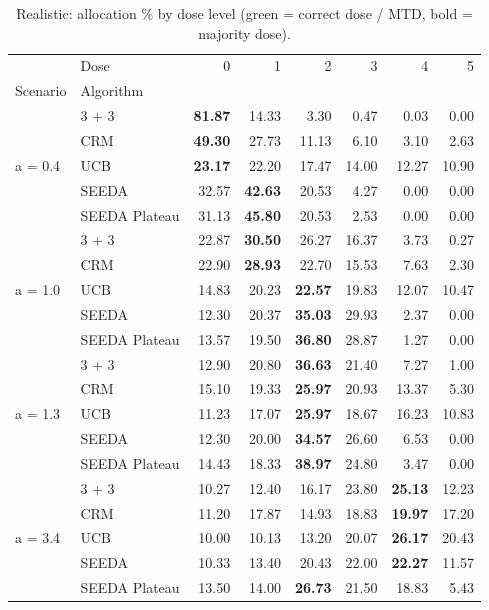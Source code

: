 \begin{table}
\centering
\caption{Realistic: allocation \% by dose level (green = correct dose / MTD, bold = majority dose).}
\label{tab:real_alloc_by_dose}
\begin{tabular}{llrrrrrr}
\toprule
 & Dose & 0 & 1 & 2 & 3 & 4 & 5 \\
Scenario & Algorithm &  &  &  &  &  &  \\
\midrule
\multirow[c]{5}{*}{a = 0.4} & 3 + 3 & {\cellcolor[HTML]{C8E6C9}} \bfseries 81.87 & 14.33 & 3.30 & 0.47 & 0.03 & 0.00 \\
 & CRM & {\cellcolor[HTML]{C8E6C9}} \bfseries 49.30 & 27.73 & 11.13 & 6.10 & 3.10 & 2.63 \\
 & UCB & {\cellcolor[HTML]{C8E6C9}} \bfseries 23.17 & 22.20 & 17.47 & 14.00 & 12.27 & 10.90 \\
 & SEEDA & {\cellcolor[HTML]{C8E6C9}} 32.57 & \bfseries 42.63 & 20.53 & 4.27 & 0.00 & 0.00 \\
 & SEEDA Plateau & {\cellcolor[HTML]{C8E6C9}} 31.13 & \bfseries 45.80 & 20.53 & 2.53 & 0.00 & 0.00 \\
\multirow[c]{5}{*}{a = 1.0} & 3 + 3 & 22.87 & \bfseries 30.50 & 26.27 & {\cellcolor[HTML]{C8E6C9}} 16.37 & 3.73 & 0.27 \\
 & CRM & 22.90 & \bfseries 28.93 & 22.70 & {\cellcolor[HTML]{C8E6C9}} 15.53 & 7.63 & 2.30 \\
 & UCB & 14.83 & 20.23 & \bfseries 22.57 & {\cellcolor[HTML]{C8E6C9}} 19.83 & 12.07 & 10.47 \\
 & SEEDA & 12.30 & 20.37 & \bfseries 35.03 & {\cellcolor[HTML]{C8E6C9}} 29.93 & 2.37 & 0.00 \\
 & SEEDA Plateau & 13.57 & 19.50 & \bfseries 36.80 & {\cellcolor[HTML]{C8E6C9}} 28.87 & 1.27 & 0.00 \\
\multirow[c]{5}{*}{a = 1.3} & 3 + 3 & 12.90 & 20.80 & \bfseries 36.63 & {\cellcolor[HTML]{C8E6C9}} 21.40 & 7.27 & 1.00 \\
 & CRM & 15.10 & 19.33 & \bfseries 25.97 & {\cellcolor[HTML]{C8E6C9}} 20.93 & 13.37 & 5.30 \\
 & UCB & 11.23 & 17.07 & \bfseries 25.97 & {\cellcolor[HTML]{C8E6C9}} 18.67 & 16.23 & 10.83 \\
 & SEEDA & 12.30 & 20.00 & \bfseries 34.57 & {\cellcolor[HTML]{C8E6C9}} 26.60 & 6.53 & 0.00 \\
 & SEEDA Plateau & 14.43 & 18.33 & \bfseries 38.97 & {\cellcolor[HTML]{C8E6C9}} 24.80 & 3.47 & 0.00 \\
\multirow[c]{5}{*}{a = 3.4} & 3 + 3 & 10.27 & 12.40 & 16.17 & 23.80 & \bfseries 25.13 & {\cellcolor[HTML]{C8E6C9}} 12.23 \\
 & CRM & 11.20 & 17.87 & 14.93 & 18.83 & \bfseries 19.97 & {\cellcolor[HTML]{C8E6C9}} 17.20 \\
 & UCB & 10.00 & 10.13 & 13.20 & 20.07 & \bfseries 26.17 & {\cellcolor[HTML]{C8E6C9}} 20.43 \\
 & SEEDA & 10.33 & 13.40 & 20.43 & 22.00 & \bfseries 22.27 & {\cellcolor[HTML]{C8E6C9}} 11.57 \\
 & SEEDA Plateau & 13.50 & 14.00 & \bfseries 26.73 & 21.50 & 18.83 & {\cellcolor[HTML]{C8E6C9}} 5.43 \\
\bottomrule
\end{tabular}
\end{table}

